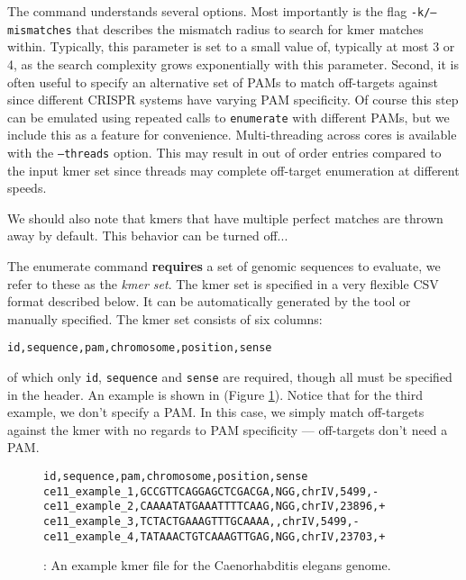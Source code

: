 \documentclass[11pt]{article}
\begin{document}
The command understands several options. Most importantly is the flag
\texttt{-k/--mismatches} that describes the mismatch radius to search
for kmer matches within. Typically, this parameter is set to a small
value of, typically at most 3 or 4, as the search complexity grows
exponentially with this parameter. Second, it is often useful to
specify an alternative set of PAMs to match off-targets against since
different CRISPR systems have varying PAM specificity. Of course this
step can be emulated using repeated calls to \texttt{enumerate} with
different PAMs, but we include this as a feature for
convenience. Multi-threading across cores is available with the
\texttt{--threads} option. This may result in out of order entries
compared to the input kmer set since threads may complete off-target
enumeration at different speeds.

We should also note that kmers that have multiple perfect matches are
thrown away by default. This behavior can be turned off...

The enumerate command {\bf requires} a set of genomic sequences to
evaluate, we refer to these as the {\it kmer set}. The kmer set is
specified in a very flexible CSV format described below. It can be
automatically generated by the tool or manually specified. The kmer
set consists of six columns:

\begin{center}
  \texttt{id,sequence,pam,chromosome,position,sense} 
\end{center}

of which only \texttt{id}, \texttt{sequence} and \texttt{sense} are
required, though all must be specified in the header. An example is
shown in (Figure \ref{fig:kmer_set}). Notice that for the third
example, we don't specify a PAM. In this case, we simply match
off-targets against the kmer with no regards to PAM specificity ---
off-targets don't need a PAM.

\begin{figure}[ht]
  \centering
  \begin{verbatim}
id,sequence,pam,chromosome,position,sense
ce11_example_1,GCCGTTCAGGAGCTCGACGA,NGG,chrIV,5499,-
ce11_example_2,CAAAATATGAAATTTTCAAG,NGG,chrIV,23896,+
ce11_example_3,TCTACTGAAAGTTTGCAAAA,,chrIV,5499,-
ce11_example_4,TATAAACTGTCAAAGTTGAG,NGG,chrIV,23703,+
  \end{verbatim}
  \caption{\label{fig:kmer_set}: An example kmer file for the
    Caenorhabditis elegans genome.}
\end{figure}
\end{document}
